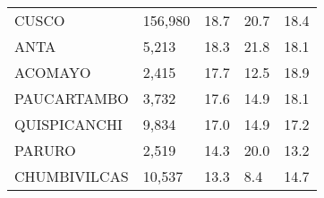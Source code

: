 \begin{tabular}{lllll}
	\cellcolor[HTML]{FF5050}CUSCO                                  & 156,980                                                               & 18.7                                                                             & 20.7                                                                        & 18.4                                                                                \\
	\cellcolor[HTML]{FF5050}ANTA                                   & 5,213                                                                 & 18.3                                                                             & 21.8                                                                        & 18.1                                                                                \\
	\cellcolor[HTML]{FF5050}ACOMAYO                                & 2,415                                                                 & 17.7                                                                             & 12.5                                                                        & 18.9                                                                                \\
	\cellcolor[HTML]{FF5050}PAUCARTAMBO                            & 3,732                                                                 & 17.6                                                                             & 14.9                                                                        & 18.1                                                                                \\
	\cellcolor[HTML]{FF5050}QUISPICANCHI                           & 9,834                                                                 & 17.0                                                                             & 14.9                                                                        & 17.2                                                                                \\
	\cellcolor[HTML]{FF5050}PARURO                                 & 2,519                                                                 & 14.3                                                                             & 20.0                                                                        & 13.2                                                                                \\
	\cellcolor[HTML]{FF5050}CHUMBIVILCAS                           & 10,537                                                                & 13.3                                                                             & 8.4                                                                         & 14.7                                                                                \\

\end{tabular}
